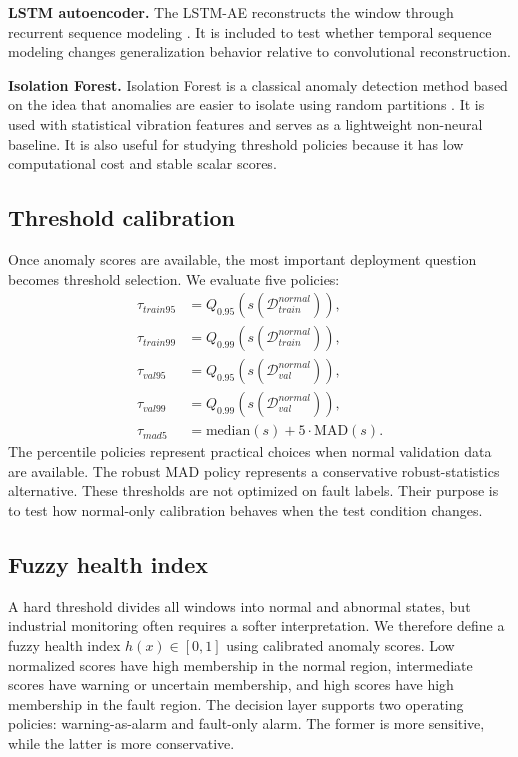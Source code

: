 \documentclass[pdflatex,sn-mathphys-num]{sn-jnl}
\begin{document}
\textbf{LSTM autoencoder.} The LSTM-AE reconstructs the window through recurrent sequence modeling \citep{hochreiter1997lstm}. It is included to test whether temporal sequence modeling changes generalization behavior relative to convolutional reconstruction.

\textbf{Isolation Forest.} Isolation Forest is a classical anomaly detection method based on the idea that anomalies are easier to isolate using random partitions \citep{liu2008iforest}. It is used with statistical vibration features and serves as a lightweight non-neural baseline. It is also useful for studying threshold policies because it has low computational cost and stable scalar scores.

\subsection{Threshold calibration}

Once anomaly scores are available, the most important deployment question becomes threshold selection. We evaluate five policies:
\begin{align}
\tau_{train95} &= Q_{0.95}(s(\mathcal{D}_{train}^{normal})),\\
\tau_{train99} &= Q_{0.99}(s(\mathcal{D}_{train}^{normal})),\\
\tau_{val95} &= Q_{0.95}(s(\mathcal{D}_{val}^{normal})),\\
\tau_{val99} &= Q_{0.99}(s(\mathcal{D}_{val}^{normal})),\\
\tau_{mad5} &= \mathrm{median}(s) + 5 \cdot \mathrm{MAD}(s).
\end{align}
The percentile policies represent practical choices when normal validation data are available. The robust MAD policy represents a conservative robust-statistics alternative. These thresholds are not optimized on fault labels. Their purpose is to test how normal-only calibration behaves when the test condition changes.

\subsection{Fuzzy health index}

A hard threshold divides all windows into normal and abnormal states, but industrial monitoring often requires a softer interpretation. We therefore define a fuzzy health index $h(x)\in[0,1]$ using calibrated anomaly scores. Low normalized scores have high membership in the normal region, intermediate scores have warning or uncertain membership, and high scores have high membership in the fault region. The decision layer supports two operating policies: warning-as-alarm and fault-only alarm. The former is more sensitive, while the latter is more conservative.
\end{document}

